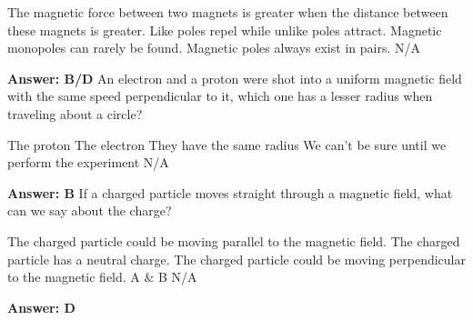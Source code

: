 \documentclass[12pt,addpoints]{exam}
\begin{document}
{{{\begin{questions}
\begin{choices}
						\choice The magnetic force between two magnets is greater when the distance between these magnets is greater.
						\choice Like poles repel while unlike poles attract.
						\choice Magnetic monopoles can rarely be found. 
						\choice Magnetic poles always exist in pairs.
						\choice N/A
					\end{choices}\textbf{Answer: B/D}
					\question An electron and a proton were shot into a uniform magnetic field with the same speed perpendicular to it, which one has a lesser radius when traveling about a circle?\begin{choices}
						\choice The proton
						\choice The electron
						\choice They have the same radius 
						\choice We can't be sure until we perform the experiment
						\choice N/A
					\end{choices}\textbf{Answer: B}
					\question If a charged particle moves straight through a magnetic field, what can we say about the charge?\begin{choices}
						\choice The charged particle could be moving parallel to the magnetic field.
						\choice The charged particle has a neutral charge. 
						\choice The charged particle could be moving perpendicular to the magnetic field.
						\choice A \& B
						\choice N/A
					\end{choices}\textbf{Answer: D}

\end{questions}}}}
\end{document}
